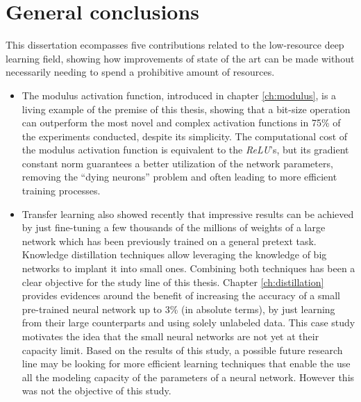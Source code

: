 \chapter{General conclusions} \label{ch:conclusions}
This dissertation ecompasses five contributions related to the low-resource deep learning field, showing how improvements of state of the art can be made without necessarily needing to spend a prohibitive amount of resources. 

\begin{itemize}
\item The modulus activation function, introduced in chapter \ref{ch:modulus}, is a living example of the premise of this thesis, showing that a bit-size operation can outperform the most novel and complex activation functions in 75\% of the experiments conducted, despite its simplicity. The computational cost of the modulus activation function is equivalent to the \textit{ReLU}'s, but its gradient constant  norm guarantees a better utilization of the network parameters, removing the ``dying neurons'' problem and often leading to more efficient training processes.

\item Transfer learning also showed recently that impressive results can be achieved by just fine-tuning a few thousands of the millions of weights of a large network which has been previously trained on a general pretext task. Knowledge distillation techniques allow leveraging the knowledge of big networks to implant it into small ones. Combining both techniques has been a clear objective for the study line of this thesis. Chapter \ref{ch:distillation} provides evidences around the benefit of increasing the accuracy of a small pre-trained neural network up to 3\% (in absolute terms), by just learning from their large counterparts and using solely unlabeled data. This case study motivates the idea that the small neural networks are not yet at their capacity limit. Based on the results of this study, a possible future research line may be looking for more efficient learning techniques that enable the use all the modeling capacity of the parameters of a neural network. However this was not the objective of this study.


\end{itemize}
